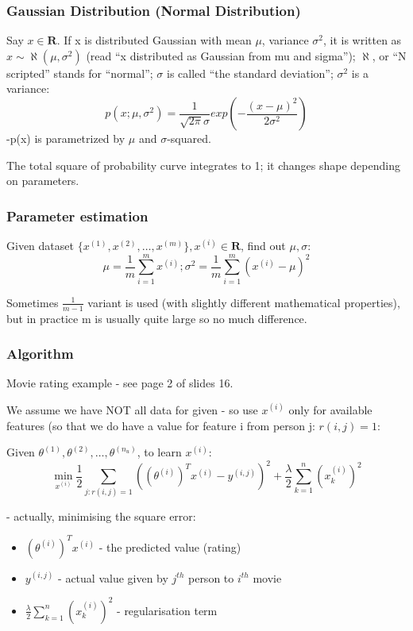 \documentclass{scrartcl}
\begin{document}
\subsubsection{Gaussian Distribution (Normal Distribution)}
\label{sec:15-2}
Say $x \in \mathbf{R}$. If x is distributed Gaussian with mean $\mu$,
variance $\sigma^2$, it is written as $x \sim \aleph(\mu, \sigma^2)$
(read ``x distributed as Gaussian from mu and sigma''); $\aleph$, or
``N scripted'' stands for ``normal''; $\sigma$ is called ``the
standard deviation''; $\sigma^2$ is a variance:
\[ p(x; \mu, \sigma^2) = \frac{1}{\sqrt{2 \pi} \sigma }
exp(-\frac{(x-\mu)^2 }{2\sigma^2}) \]
-p(x) is parametrized by $\mu$ and $\sigma$-squared.

The total square of probability curve integrates to 1; it changes
shape depending on parameters.

\subsubsection{Parameter estimation}
Given dataset $\{x^{(1)}, x^{(2)}, \dots, x^{(m)}\}, x^{(i)} \in
\mathbf{R}$, find out $\mu, \sigma$:
\[\mu = \frac{1}{m} \sum \limits_{i=1}^m x^{(i)} ; \sigma^2 =
\frac{1}{m} \sum \limits_{i=1}^m (x^{(i)} - \mu)^2 \]

Sometimes $\frac{1}{m-1}$ variant is used (with slightly different
mathematical properties), but in practice m is usually quite large so
no much difference.

\subsubsection{Algorithm}
\label{sec:15-3}
Movie rating example - see page 2 of slides 16.

We assume we have NOT all data for given - so use $x^{(i)}$ only for
available features (so that we do have a value for feature i from
person j: $r(i, j) = 1$:

Given $\theta^{(1)}, \theta^{(2)}, \dots, \theta^{(n_u)}$, to learn
$x^{(i)}$: \[ 
\min \limits_{x^{(i)}} \frac{1}{2} \sum \limits_{j:r(i, j) = 1}
((\theta^{(i)})^T x^{(i)} - y^{(i,j)})^2 + \frac{\lambda}{2} \sum
\limits_{k=1}^n (x_k^{(i)})^2 \]

- actually, minimising the square error:
\begin{itemize}
\item $(\theta^{(i)})^T x^{(i)}$ - the predicted value (rating)
\item $y^{(i,j)}$ - actual value given by $j^{th}$ person to $i^{th}$
  movie
\item $\frac{\lambda}{2} \sum \limits_{k=1}^n (x_k^{(i)})^2$ -
  regularisation term
\end{itemize}
\end{document}
